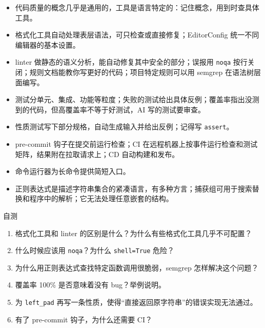 \documentclass[a4paper]{article}
\begin{document}
\begin{itemize}
\item 代码质量的概念几乎是通用的，工具是语言特定的：记住概念，用到时查具体工具。
\item 格式化工具自动处理表层语法，可只检查或直接修复；EditorConfig 统一不同编辑器的基本设置。
\item linter 做静态的语义分析，能自动修复其中安全的部分；误报用 \texttt{noqa} 按行关闭；规则文档能教你写更好的代码；项目特定规则可以用 semgrep 在语法树层面编写。
\item 测试分单元、集成、功能等粒度；失败的测试给出具体反例；覆盖率指出没测到的代码，但高覆盖率不等于好测试，AI 写的测试要审查。
\item 性质测试写下部分规格，自动生成输入并给出反例；记得写 \texttt{assert}。
\item pre-commit 钩子在提交前运行检查；CI 在远程机器上按事件运行检查和测试矩阵，结果附在拉取请求上；CD 自动构建和发布。
\item 命令运行器为长命令提供简短入口。
\item 正则表达式是描述字符串集合的紧凑语言，有多种方言；捕获组可用于搜索替换和程序中的解析；它无法处理任意嵌套的结构。
\end{itemize}

\begin{practicebox}{自测}
\begin{enumerate}
\item 格式化工具和 linter 的区别是什么？为什么有些格式化工具几乎不可配置？
\item 什么时候应该用 \texttt{noqa}？为什么 \texttt{shell=True} 危险？
\item 为什么用正则表达式查找特定函数调用很脆弱，semgrep 怎样解决这个问题？
\item 覆盖率 100\% 是否意味着没有 bug？举例说明。
\item 为 \texttt{left\_pad} 再写一条性质，使得“直接返回原字符串”的错误实现无法通过。
\item 有了 pre-commit 钩子，为什么还需要 CI？
\end{enumerate}
\end{practicebox}
\end{document}
